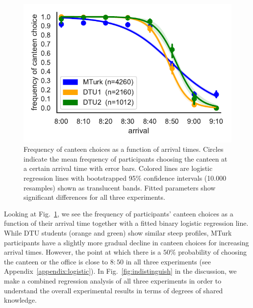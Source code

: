 \documentclass[twocolumn,a4paper,superscriptaddress,nofootinbib]{revtex4}
\begin{document}
\begin{figure} %
\centering\includegraphics[width=0.6\linewidth]{fig1_logit}
\caption{Frequency of canteen choices as a function of arrival times. Circles indicate the mean frequency of participants choosing the canteen at a certain arrival time with error bars. Colored lines are logistic regression lines with bootstrapped 95\% confidence intervals (10.000 resamples) shown as translucent bands. Fitted parameters show significant differences for all three experiments.}
\label{fig:1}
\end{figure}
Looking at Fig.~\ref{fig:1}, we see the frequency of participants' canteen choices as a function of their arrival time together with a fitted binary logistic regression line. While DTU students (orange and green) show similar steep profiles, MTurk participants have a slightly more gradual decline in canteen choices for increasing arrival times. However, the point at which there is a $50\%$ probability of choosing the canteen or the office is close to $8{:}50$ in all three experiments (see Appendix~\ref{appendix:logistic}). In Fig.~\ref{fig:indistinguish} in the discussion, we make a combined regression analysis of all three experiments in order to understand the overall experimental results in terms of degrees of shared knowledge.
\end{document}

